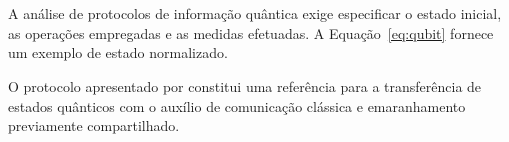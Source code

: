 \chapter{}
A análise de protocolos de informação quântica exige especificar o estado inicial, as operações empregadas e as medidas efetuadas. A Equação~\eqref{eq:qubit} fornece um exemplo de estado normalizado.

O protocolo apresentado por \textcite{bennett1993} constitui uma referência para a transferência de estados quânticos com o auxílio de comunicação clássica e emaranhamento previamente compartilhado.
